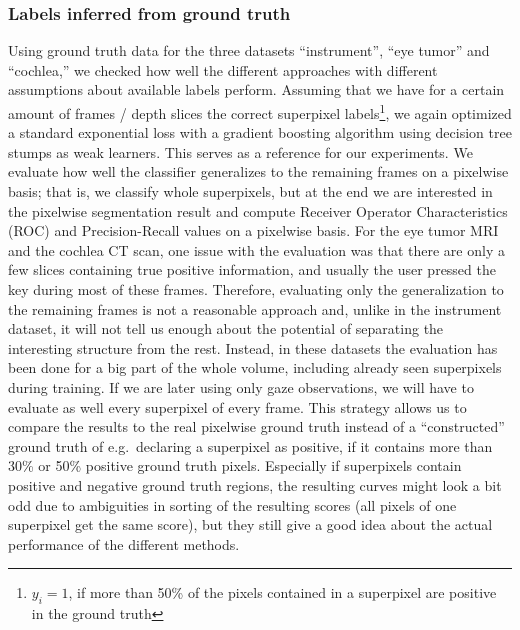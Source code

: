 \subsubsection*{Labels inferred from ground truth}
Using ground truth data for the three datasets ``instrument'', ``eye tumor'' and ``cochlea,'' we checked how well the different approaches with different assumptions about available labels perform. 
Assuming that we have for a certain amount of frames / depth slices the correct superpixel labels\footnote{$y_i = 1$, if more than 50\% of the pixels contained in a superpixel are positive in the ground truth}, we again optimized a standard exponential loss with a gradient boosting algorithm using decision tree stumps as weak learners. 
This serves as a reference for our experiments.
We evaluate how well the classifier generalizes to the remaining frames on a pixelwise basis; that is, we classify whole superpixels, but at the end we are interested in the pixelwise segmentation result and compute Receiver Operator Characteristics (ROC) and Precision-Recall values on a pixelwise basis. 
For the eye tumor MRI and the cochlea CT scan, one issue with the evaluation was that there are only a few slices containing true positive information, and usually the user pressed the key during most of these frames. 
Therefore, evaluating only the generalization to the remaining frames is not a reasonable approach and, unlike in the instrument dataset, it will not tell us enough about the potential of separating the interesting structure from the rest. 
Instead, in these datasets the evaluation has been done for a big part of the whole volume, including already seen superpixels during training. 
If we are later using only gaze observations, we will have to evaluate as well every superpixel of every frame.
This strategy allows us to compare the results to the real pixelwise ground truth instead of a ``constructed'' ground truth of e.g.\ declaring a superpixel as positive, if it contains more than 30\% or 50\% positive ground truth pixels.
Especially if superpixels contain positive and negative ground truth regions, the resulting curves might look a bit odd due to ambiguities in sorting of the resulting scores (all pixels of one superpixel get the same score), but they still give a good idea about the actual performance of the different methods. 

